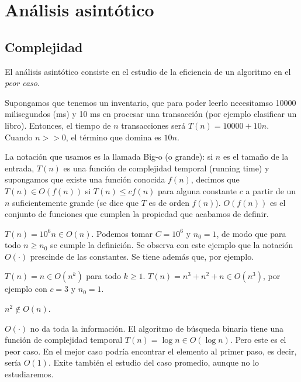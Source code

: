 \documentclass[AL.tex]{subfiles}
\begin{document}

\chapter{Análisis asintótico}

\section{Complejidad}

El análisis asintótico consiste en el estudio de la eficiencia de un algoritmo en el \emph{peor caso}. 

\begin{ej}
Supongamos que tenemos un inventario, que para poder leerlo necesitamso 10000 milisegundos (ms) y 10 ms en procesar una transacción (por ejemplo clasificar un libro). Entonces, el tiempo de $n$ transacciones será $T(n)=10000+10n$. Cuando $n>>0$, el término que domina es $10n$. 
\end{ej}

La notación que usamos es la llamada Big-o (o grande): si $n$ es el tamaño de la entrada, $T(n)$ es una función de complejidad temporal (running time) y supongamos que existe una función conocida $f(n)$, decimos que $T(n)\in O(f(n))$ si $T(n)\leq c f(n)$ para alguna constante $c$ a partir de un $n$ suficientemente grande (se dice que $T$ es de orden $f(n)$). $O(f(n))$ es el conjunto de funciones que cumplen la propiedad que acabamos de definir.

\begin{ej}
$T(n)=10^6n\in O(n)$. Podemos tomar $C=10^6$ y $n_0=1$, de modo que para todo $n\geq n_0$ se cumple la definición. Se observa con este ejemplo que la notación $O(\cdot)$ prescinde de las constantes. Se tiene además que, por ejemplo.
\end{ej}
\begin{ej}
$T(n)=n\in O(n^k)$ para todo $k\geq 1$. $T(n)=n^3+n^2+n\in O(n^3)$, por ejemplo con $c=3$ y $n_0=1$.
\end{ej}

\begin{ej}
$n^2\notin O(n)$. 
\end{ej}

\begin{ej}
$O(\cdot)$ no da toda la información. El algoritmo de búsqueda binaria tiene una función de complejidad temporal $T(n)=\log n\in O(\log n)$. Pero este es el peor caso. En el mejor caso podría encontrar el elemento al primer paso, es decir, sería $O(1)$. Exite también el estudio del caso promedio, aunque no lo estudiaremos. 
\end{ej}
\end{document}
